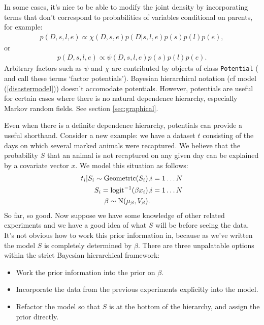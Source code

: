 In some cases, it's nice to be able to modify the joint density by incorporating terms that don't correspond to probabilities of variables conditional on parents, for example:
\begin{eqnarray*}
    p(D,s,l,e) \propto \chi(D,s,e) p(D|s,l,e) p(s) p(l) p(e),
\end{eqnarray*}
or
\begin{eqnarray*}
    p(D,s,l,e) \propto \psi(D,s,l,e) p(s) p(l) p(e).
\end{eqnarray*}
Arbitrary factors such as $\psi$ and $\chi$ are contributed by objects of class \texttt{Potential} (\cite{dawidmarkov} and \cite{jordangraphical} call these terms `factor potentials'). Bayesian hierarchical notation (cf model (\ref{disastermodel})) doesn't accomodate potentials. However, potentials are useful for certain cases where there is no natural dependence hierarchy, especially Markov random fields. See section \ref{sec:graphical}.

Even when there is a definite dependence hierarchy, potentials can provide a useful shorthand. Consider a new example: we have a dataset $t$ consisting of the days on which several marked animals were recaptured. We believe that the probability $S$ that an animal is not recaptured on any given day can be explained by a covariate vector $x$. We model this situation as follows:
\begin{eqnarray*}
    t_i|S_i \sim \textup{Geometric}(S_i), & i=1\ldots N\\
    S_i = \textup{logit}^{-1}(\beta x_i), &i=1\ldots N\\
    \beta\sim \textup{N}(\mu_\beta, V_\beta).
\end{eqnarray*}
So far, so good. Now suppose we have some knowledge of other related experiments and we have a good idea of what $S$ will be before seeing the data. It's not obvious how to work this prior information in, because as we've written the model $S$ is completely determined by $\beta$. There are three unpalatable options within the strict Bayesian hierarchical framework:
\begin{itemize}
    \item Work the prior information into the prior on $\beta$.
    \item Incorporate the data from the previous experiments explicitly into the model.
    \item Refactor the model so that $S$ is at the bottom of the hierarchy, and assign the prior directly.
\end{itemize}

